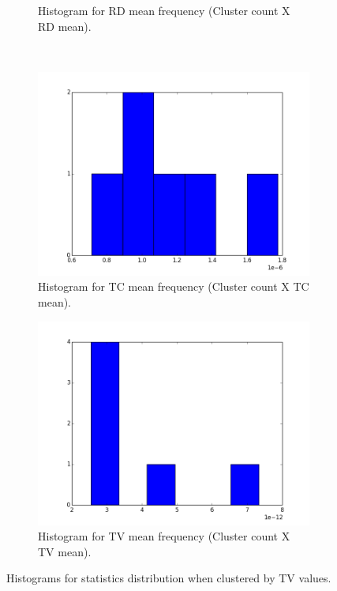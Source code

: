 \documentclass[a4paper,11pt]{report}
\begin{document}
\begin{figure}[!ht]
\begin{subfigure}[t]{.49\textwidth}
        \caption{Histogram for RD mean frequency (Cluster count X RD mean).}
        \label{subfig:fa_hist_rd}
      \end{subfigure}\hfill\\
      \begin{subfigure}[t]{.49\textwidth}
        \includegraphics[width=1\linewidth]{img/histograms/tv_clustered_fa_mask_tc_means_hist.png}
        \caption{Histogram for TC mean frequency (Cluster count X TC mean).}
        \label{subfig:fa_hist_tc}
      \end{subfigure}\hfill%
      \begin{subfigure}[t]{.49\textwidth}
        \includegraphics[width=1\linewidth]{img/histograms/tv_clustered_fa_mask_tv_means_hist.png}
        \caption{Histogram for TV mean frequency (Cluster count X TV mean).}
        \label{subfig:fa_hist_tv}
      \end{subfigure}\hfill

      \caption{Histograms for statistics distribution when clustered by TV values.}
      \label{fig:fa-histograms}
    \end{figure}
\end{document}
